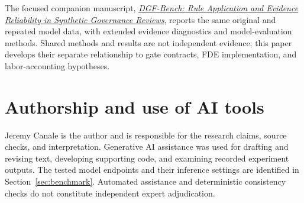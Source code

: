 The focused companion manuscript,
\href{https://github.com/jeremy1392/dgf-agentic-bench/tree/main/paper2}{\emph{DGF-Bench: Rule
Application and Evidence Reliability in Synthetic Governance Reviews}}, reports the same original
and repeated model data, with extended evidence diagnostics and model-evaluation methods.
Shared methods and results are not independent evidence; this paper develops their separate
relationship to gate contracts, FDE implementation, and labor-accounting hypotheses.

\section*{Authorship and use of AI tools}

Jeremy Canale is the author and is responsible for the research claims, source checks, and
interpretation. Generative AI assistance was used for drafting and revising text, developing
supporting code, and examining recorded experiment outputs. The tested model endpoints and
their inference settings are identified in Section~\ref{sec:benchmark}. Automated assistance
and deterministic consistency checks do not constitute independent expert adjudication.
